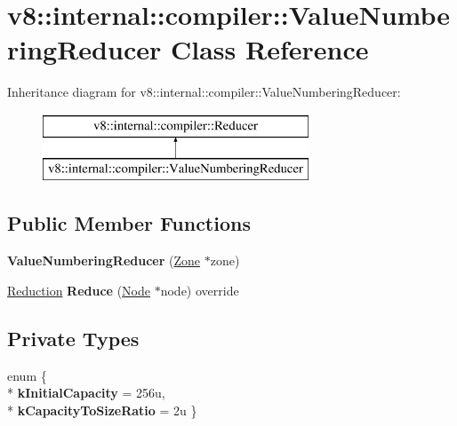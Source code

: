\hypertarget{classv8_1_1internal_1_1compiler_1_1_value_numbering_reducer}{}\section{v8\+:\+:internal\+:\+:compiler\+:\+:Value\+Numbering\+Reducer Class Reference}
\label{classv8_1_1internal_1_1compiler_1_1_value_numbering_reducer}
Inheritance diagram for v8\+:\+:internal\+:\+:compiler\+:\+:Value\+Numbering\+Reducer\+:\begin{figure}[H]
\begin{center}
\leavevmode
\includegraphics[height=2.000000cm]{classv8_1_1internal_1_1compiler_1_1_value_numbering_reducer}
\end{center}
\end{figure}
\subsection*{Public Member Functions}
\begin{DoxyCompactItemize}
\item 
{\bfseries Value\+Numbering\+Reducer} (\hyperlink{classv8_1_1internal_1_1_zone}{Zone} $\ast$zone)\hypertarget{classv8_1_1internal_1_1compiler_1_1_value_numbering_reducer_ab2be15d281d9c3734cf67b41dd7a458d}{}\label{classv8_1_1internal_1_1compiler_1_1_value_numbering_reducer_ab2be15d281d9c3734cf67b41dd7a458d}

\item 
\hyperlink{classv8_1_1internal_1_1compiler_1_1_reduction}{Reduction} {\bfseries Reduce} (\hyperlink{classv8_1_1internal_1_1compiler_1_1_node}{Node} $\ast$node) override\hypertarget{classv8_1_1internal_1_1compiler_1_1_value_numbering_reducer_a3f49dd1deee724ec21fce3cd9c38b38a}{}\label{classv8_1_1internal_1_1compiler_1_1_value_numbering_reducer_a3f49dd1deee724ec21fce3cd9c38b38a}

\end{DoxyCompactItemize}
\subsection*{Private Types}
\begin{DoxyCompactItemize}
\item 
enum \{ \\*
{\bfseries k\+Initial\+Capacity} = 256u, 
\\*
{\bfseries k\+Capacity\+To\+Size\+Ratio} = 2u
 \}\hypertarget{classv8_1_1internal_1_1compiler_1_1_value_numbering_reducer_af5f25908720a9bf53452ce87debe0a18}{}\label{classv8_1_1internal_1_1compiler_1_1_value_numbering_reducer_af5f25908720a9bf53452ce87debe0a18}

\end{DoxyCompactItemize}

